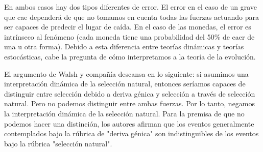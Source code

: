 En ambos casos hay dos tipos diferentes de error. El error en el caso de un grave que cae dependerá de que no tomamos en cuenta todas las fuerzas actuando para ser capaces de predecir el lugar de caída. En el caso de las monedas, el error es intrínseco al fenómeno (cada moneda tiene una probabilidad del 50\% de caer de una u otra forma). Debido a esta diferencia entre teorías dinámicas y teorías estocásticas, cabe la pregunta de cómo interpretamos a la teoría de la evolución.

El argumento de Walsh y compañía descansa en lo siguiente: si asumimos una interpretación dinámica de la selección natural, entonces seríamos capaces de distinguir entre selección debido a deriva génica y selección a través de selección natural.
Pero no podemos distinguir entre ambas fuerzas. Por lo tanto, negamos la interpretación dinámica de la selección natural. Para la premisa de que no podemos hacer una distinción, los autores afirman que los eventos generalmente contemplados bajo la rúbrica de "deriva génica" son indistinguibles de los eventos bajo la rúbrica "selección natural".


